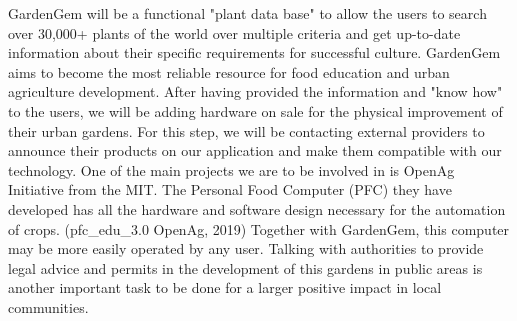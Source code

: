 GardenGem will be a functional "plant data base" to allow the users to search over 30,000+ plants of the world over multiple criteria and get up-to-date information about their specific requirements for successful culture. GardenGem aims to become the most reliable resource for food education and urban agriculture development. After having provided the information and "know how" to the users, we will be adding hardware on sale for the physical improvement of their urban gardens. For this step, we will be contacting external providers to announce their products on our application and make them compatible with our technology. One of the main projects we are to be involved in is OpenAg Initiative from the MIT. The Personal Food Computer (PFC) they have developed has all the hardware and software design necessary for the automation of crops. (pfc\_edu\_3.0 OpenAg, 2019) Together with GardenGem, this computer may be more easily operated by any user. Talking with authorities to provide legal advice and permits in the development of this gardens in public areas is another important task to be done for a larger positive impact in local communities.



